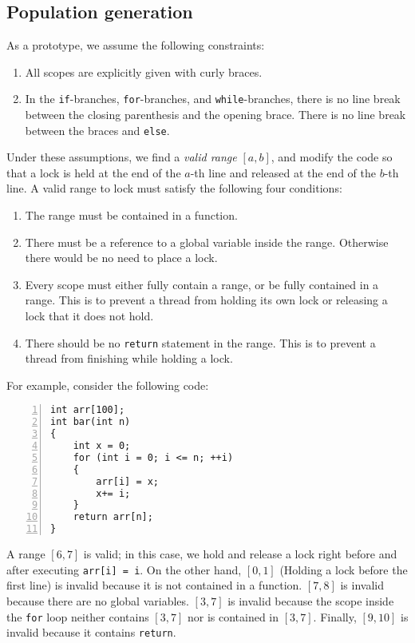 \subsection{Population generation}

As a prototype, we assume the following constraints:

\begin{enumerate}
    \item All scopes are explicitly given with curly braces.
    \item In the \verb|if|-branches, \verb|for|-branches, and \verb|while|-branches, there is no line break between the closing parenthesis and the opening brace. There is no line break between the braces and \verb|else|.
\end{enumerate}

Under these assumptions, we find a \textit{valid range} $[a, b]$, and modify the code so that a lock is held at the end of the $a$-th line and released at the end of the $b$-th line. A valid range to lock must satisfy the following four conditions:

\begin{enumerate}
    \item The range must be contained in a function.
    \item There must be a reference to a global variable inside the range. Otherwise there would be no need to place a lock.
    \item Every scope must either fully contain a range, or be fully contained in a range. This is to prevent a thread from holding its own lock or releasing a lock that it does not hold.
    \item There should be no \verb|return| statement in the range. This is to prevent a thread from finishing while holding a lock.
\end{enumerate}

For example, consider the following code:


\begin{lstlisting}[frame=tb, xleftmargin=2em, framexleftmargin=1.5em, numbers=left]
int arr[100];
int bar(int n)
{
    int x = 0;
    for (int i = 0; i <= n; ++i)
    {
        arr[i] = x;
        x+= i;
    }
    return arr[n];
}
\end{lstlisting}

A range $[6, 7]$ is valid; in this case, we hold and release a lock right before and after executing \verb|arr[i] = i|. On the other hand, $[0, 1]$ (Holding a lock before the first line) is invalid because it is not contained in a function. $[7, 8]$ is invalid because there are no global variables. $[3, 7]$ is invalid because the scope inside the \verb|for| loop neither contains $[3, 7]$ nor is contained in $[3, 7]$. Finally, $[9, 10]$ is invalid because it contains \verb|return|.

